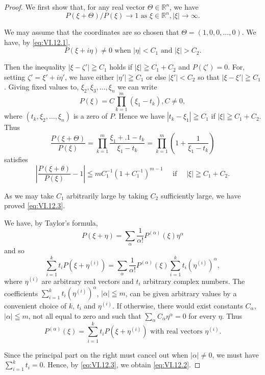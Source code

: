 \begin{proof}
 We first show that, for any real vector $\Theta\in \mathbb{R}^{n}$, we have 
\begin{equation}\label{eq:VI.12.3}
P (\xi + \Theta) / P (\xi) \rightarrow 1 \text{ as } \xi \in \mathbb{R}^{n}, | \xi | \rightarrow \infty . \end{equation}

We may assume that the coordinates are so chosen that $\Theta = (1,0,0,\ldots ,0)$. We have, by \eqref{eq:VI.12.1}, 
\[
P (\xi + i \eta) \neq 0 \text{ when } | \eta | < C _{1} \text{ and } | \xi | > C _{2}.
\]

Then the inequality $|\xi - \zeta'| \geqq C_1$ holds if $|\xi| \geqq C_1 + C_2$ and $P(\zeta') = 0$. For, setting $\zeta' = \xi' + i\eta'$, we have either $|\eta'| \geqq C_1$ or else $|\xi'| < C_2$ so that $|\xi - \xi'| \geqq C_1$. Giving fixed values to, $\xi_2, \xi_3, \ldots, \xi_n$ we can write 
\[
P (\xi) = C \prod\limits_{k=1} ^{m} \left(\xi_{1} - t _{k}\right), C \neq 0,
\]
where $(t_k, \xi_2, \ldots, \xi_n)$ is a zero of $P$. Hence we have $|t_k - \xi_1| \geqq C_1$ if $|\xi| \geqq C_1 + C_2$. Thus 
\[
\frac {P (\xi + \Theta)}{P (\xi)} = \prod\limits_{k=1} ^{m} \frac {\xi_{1} + . 1 - t _{k}}{\xi_{1} - t _{k}} = \prod\limits_{k=1} ^{m} \left(1 + \frac {1}{\xi_{1} - t _{k}}\right)
\]
satisfies 
\[
\left| \frac {P (\xi + \theta)}{P (\xi)} - 1 \right| \leqq m C _{1} ^{-1} (1 + C _{1} ^{-1}) ^{m-1} \quad \text{ if } \quad | \xi | \geqq C _{1} + C _{2}.
\]

As we may take $C_1$ arbitrarily large by taking $C_2$ sufficiently large, we have proved \eqref{eq:VI.12.3}. 

We have, by Taylor's formula, 
\[
P (\xi + \eta) = \sum\limits_{\alpha} \frac {1}{\alpha !} P ^{(\alpha)} (\xi) \eta^{\alpha}
\]
and so 
\begin{equation}\label{eq:VI.12.4}
\sum\limits_{i=1} ^{k} t _{i} P (\xi + \eta^{(i)}) = \sum\limits_{\alpha} \frac {1}{\alpha !} P ^{(\alpha)} (\xi) \sum\limits_{i=1} ^{k} t _{i} (\eta^{(i)}) ^{\alpha},
\end{equation}
where $\eta^{(i)}$ are arbitrary real vectors and $t_i$ arbitrary complex numbers. The coefficients $\sum\limits_{i=1}^{k} t_i (\eta^{(i)})^\alpha$, $|\alpha| \leqq m$, can be given arbitrary values by a convenient choice of $k$, $t_i$ and $\eta^{(i)}$. If otherwise, there would exist constants $C_\alpha$, $|\alpha| \leqq m$, not all equal to zero and such that $\sum\limits_{\alpha} C_\alpha \eta^\alpha = 0$ for every $\eta$. Thus 
\[
P ^{(\alpha)} (\xi) = \sum\limits_{i=1} ^{k} t _{i} P (\xi + \eta^{(i)}) \text{ with real vectors } \eta^{(i)}.
\]

Since the principal part on the right must cancel out when $|\alpha| \neq 0$, we must have $\sum\limits_{i=1}^{k} t_i = 0$. Hence, by \eqref{eq:VI.12.3}, we obtain \eqref{eq:VI.12.2}. 
\end{proof}

